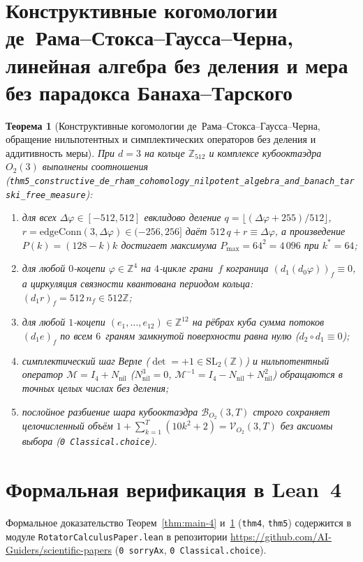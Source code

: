 \documentclass[11pt,a4paper]{article}
\theoremstyle{plain}
\newtheorem{theorem}{Теорема}[section]
\theoremstyle{definition}
\begin{document}
\section{Конструктивные когомологии де~Рама--Стокса--Гаусса--Черна, линейная алгебра без деления и мера без парадокса Банаха--Тарского}
\label{sec:constructive-foundations}

\begin{theorem}[Конструктивные когомологии де~Рама--Стокса--Гаусса--Черна, обращение нильпотентных и симплектических операторов без деления и аддитивность меры]
\label{thm:main-5}
При $d=3$ на кольце $\mathbb{Z}_{512}$ и комплексе кубооктаэдра~$O_2(3)$ выполнены соотношения (\texttt{thm5\_constructive\_de\_rham\_cohomology\_nilpotent\_algebra\_and\_banach\_tarski\_free\_measure}):
\begin{enumerate}[label=\textbf{(\roman*)},leftmargin=*]
\item для всех $\Delta\varphi\in[-512,512]$ евклидово деление $q = \lfloor(\Delta\varphi+255)/512\rfloor$, $r = \mathrm{edgeConn}(3,\Delta\varphi)\in(-256,256]$ даёт $512\,q + r \equiv \Delta\varphi$, а произведение $P(k) = (128-k)k$ достигает максимума $P_{\max} = 64^2 = 4\,096$ при $k^* = 64$;
\item для любой $0$-коцепи $\varphi\in\mathbb{Z}^4$ на $4$-цикле грани~$f$ кограница $(d_1(d_0\varphi))_f \equiv 0$, а циркуляция связности квантована периодом кольца: $(d_1 r)_f = 512\,n_f \in 512\mathbb{Z}$;
\item для любой $1$-коцепи $(e_1,\dots,e_{12})\in\mathbb{Z}^{12}$ на рёбрах куба сумма потоков $(d_1 e)_f$ по всем $6$~граням замкнутой поверхности равна нулю ($d_2\circ d_1\equiv 0$);
\item симплектический шаг Верле ($\det=+1\in\mathrm{SL}_2(\mathbb{Z})$) и нильпотентный оператор $\mathcal{M} = I_4 + N_{\mathrm{nil}}$ ($N_{\mathrm{nil}}^3 = 0$, $\mathcal{M}^{-1} = I_4 - N_{\mathrm{nil}} + N_{\mathrm{nil}}^2$) обращаются в точных целых числах без деления;
\item послойное разбиение шара кубооктаэдра $\mathcal{B}_{O_2}(3,T)$ строго сохраняет целочисленный объём $1 + \sum_{k=1}^T(10k^2+2) = \mathcal{V}_{O_2}(3,T)$ без аксиомы выбора (\texttt{0 Classical.choice}).
\end{enumerate}
\end{theorem}

\section{Формальная верификация в Lean~4}
Формальное доказательство Теорем~\ref{thm:main-4} и~\ref{thm:main-5} (\texttt{thm4}, \texttt{thm5}) содержится в модуле \texttt{RotatorCalculusPaper.lean} в репозитории \url{https://github.com/AI-Guiders/scientific-papers} (\texttt{0 sorryAx}, \texttt{0 Classical.choice}).
\end{document}
